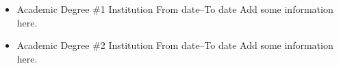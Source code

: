 \documentclass[11pt,a4paper]{article}
\begin{document}
\begin{minipage}[t][20cm]{11cm}
\begin{itemize}[%
        leftmargin=*,%
        rightmargin=-1cm,%
        label=\textcolor{\defaultcolor}{\textbullet},%
        itemsep=-0.3cm%
        ]
{            }%
    \end{itemize}%
    \vspace*{0.3cm}%
    \vspace*{0.1cm}%
    \begin{itemize}[%
        listparindent=1.5em,%
        leftmargin=*,%
        rightmargin=0cm,%
        label=\textcolor{\defaultcolor}{\textbullet}%
        ]%
        \item \educationentry%
            {Academic Degree \#1}%
            {Institution}%
            {From date--To date}%
            {Add some information here.}%
        \item \educationentry%
            {Academic Degree \#2}%
            {Institution}%
            {From date--To date}%
            {Add some information here.}%
    \end{itemize}%
\end{minipage}%
\end{document}
